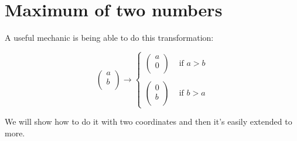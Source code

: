 \section*{Maximum of two numbers}

A useful mechanic is being able to do this transformation:

\begin{equation*}
    \left( \begin{matrix} a \\ b \\ \end{matrix} \right)
    \rightarrow 
    \begin{cases}
        \left( \begin{matrix} a \\ 0 \\ \end{matrix} \right) & \text{ if } a > b \\
        \\
        \left( \begin{matrix} 0 \\ b \\ \end{matrix} \right) & \text{ if } b > a 
    \end{cases}
\end{equation*}


We will show how to do it with two coordinates and then it's easily extended to more.

